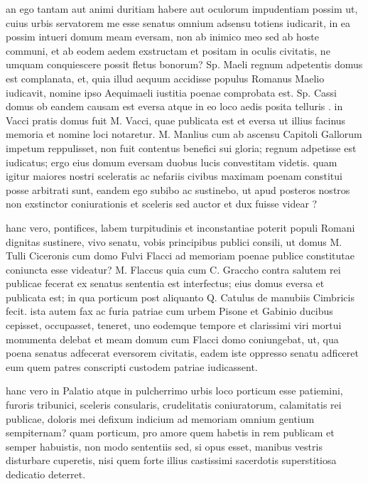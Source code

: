  an ego tantam aut animi duritiam habere aut oculorum impudentiam possim ut, cuius urbis servatorem me esse senatus omnium adsensu totiens iudicarit, in ea possim intueri domum meam eversam, non ab inimico meo sed ab hoste communi, et ab eodem aedem exstructam et positam in oculis civitatis, ne umquam conquiescere possit fletus bonorum? Sp. Maeli regnum adpetentis domus est complanata, et, quia illud aequum accidisse populus Romanus Maelio iudicavit, nomine ipso Aequimaeli iustitia poenae comprobata est. Sp. Cassi domus ob eandem causam est eversa atque in eo loco aedis posita telluris . in Vacci pratis domus fuit M. Vacci, quae publicata est et eversa ut illius facinus memoria et nomine loci notaretur. M. Manlius cum ab ascensu Capitoli Gallorum impetum reppulisset, non fuit contentus benefici sui gloria; regnum adpetisse est iudicatus; ergo eius domum eversam duobus lucis convestitam videtis. quam igitur maiores nostri sceleratis ac nefariis civibus maximam poenam constitui posse arbitrati sunt, eandem ego subibo ac sustinebo, ut apud posteros nostros non exstinctor coniurationis et sceleris sed auctor et dux fuisse videar ?

 hanc vero, pontifices, labem turpitudinis et inconstantiae poterit populi Romani dignitas sustinere, vivo senatu, vobis principibus publici consili, ut domus M. Tulli Ciceronis cum domo Fulvi Flacci ad memoriam poenae publice constitutae coniuncta esse videatur? M. Flaccus quia cum C. Graccho contra salutem rei publicae fecerat ex senatus sententia est interfectus; eius domus eversa et publicata est; in qua porticum post aliquanto Q. Catulus de manubiis Cimbricis fecit. ista autem fax ac furia patriae cum urbem Pisone et Gabinio ducibus cepisset, occupasset, teneret, uno eodemque tempore et clarissimi viri mortui monumenta delebat et meam domum cum Flacci domo coniungebat, ut, qua poena senatus adfecerat eversorem civitatis, eadem iste oppresso senatu adficeret eum quem patres conscripti custodem patriae iudicassent.

 hanc vero in Palatio atque in pulcherrimo urbis loco porticum esse patiemini, furoris tribunici, sceleris consularis, crudelitatis coniuratorum, calamitatis rei publicae, doloris mei defixum indicium ad memoriam omnium gentium sempiternam? quam porticum, pro amore quem habetis in rem publicam et semper habuistis, non modo sententiis sed, si opus esset, manibus vestris disturbare cuperetis, nisi quem forte illius castissimi sacerdotis superstitiosa dedicatio deterret.

